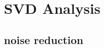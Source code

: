 \documentclass{article}
\begin{document}




\section{SVD Analysis}
\subsection{noise reduction}
\end{document}
